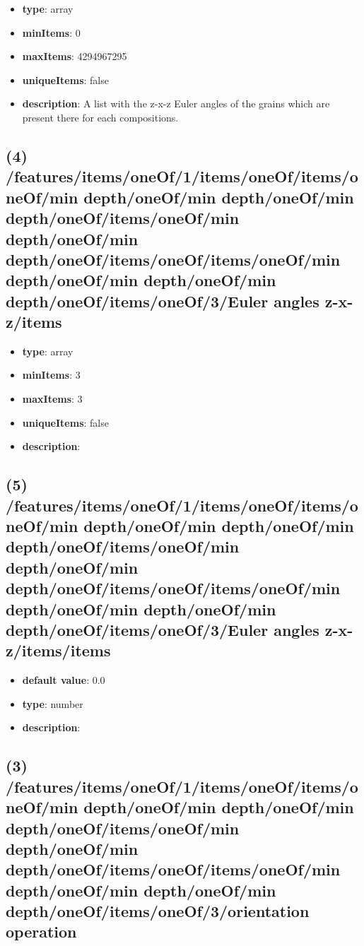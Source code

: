 \begin{itemize}[leftmargin=3em]\item {\bf type}: array
\item {\bf minItems}: 0
\item {\bf maxItems}: 4294967295
\item {\bf uniqueItems}: false
\item {\bf description}: A list with the z-x-z Euler angles of the grains which are present there for each compositions.
\end{itemize}\subsection{(4) /features/items/oneOf/1/items/oneOf/items/oneOf/min depth/oneOf/min depth/oneOf/min depth/oneOf/items/oneOf/min depth/oneOf/min depth/oneOf/items/oneOf/items/oneOf/min depth/oneOf/min depth/oneOf/min depth/oneOf/items/oneOf/3/Euler angles z-x-z/items}
\begin{itemize}[leftmargin=4em]\item {\bf type}: array
\item {\bf minItems}: 3
\item {\bf maxItems}: 3
\item {\bf uniqueItems}: false
\item {\bf description}: 
\end{itemize}\subsection{(5) /features/items/oneOf/1/items/oneOf/items/oneOf/min depth/oneOf/min depth/oneOf/min depth/oneOf/items/oneOf/min depth/oneOf/min depth/oneOf/items/oneOf/items/oneOf/min depth/oneOf/min depth/oneOf/min depth/oneOf/items/oneOf/3/Euler angles z-x-z/items/items}
\begin{itemize}[leftmargin=5em]\item {\bf default value}: 0.0
\item {\bf type}: number
\item {\bf description}: 
\end{itemize}\subsection{(3) /features/items/oneOf/1/items/oneOf/items/oneOf/min depth/oneOf/min depth/oneOf/min depth/oneOf/items/oneOf/min depth/oneOf/min depth/oneOf/items/oneOf/items/oneOf/min depth/oneOf/min depth/oneOf/min depth/oneOf/items/oneOf/3/orientation operation}

